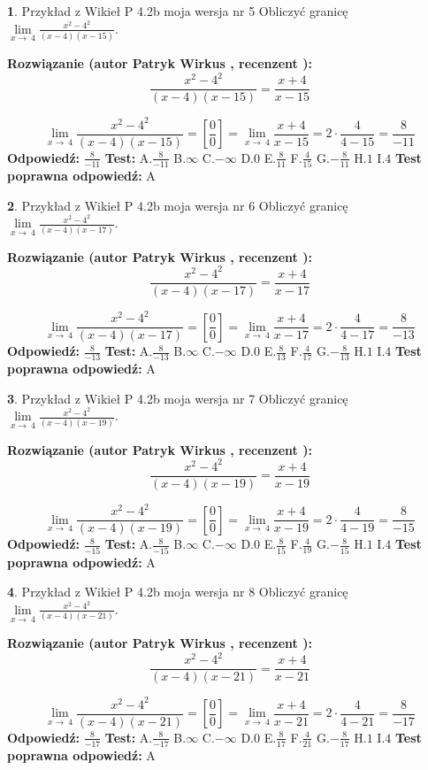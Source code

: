 \documentclass[12pt, a4paper]{article}
\theoremstyle{definition} %
\newtheorem{zad}{}
\newcommand{\zadStart}[1]{\begin{zad}#1\newline}
\newcommand{\zadStop}{\end{zad}}
\newcommand{\rozwStart}[2]{\noindent \textbf{Rozwiązanie (autor #1 , recenzent #2): }\newline}
\newcommand{\rozwStop}{\newline}
\newcommand{\odpStart}{\noindent \textbf{Odpowiedź:}\newline}
\newcommand{\odpStop}{\newline}
\newcommand{\testStart}{\noindent \textbf{Test:}\newline}
\newcommand{\testStop}{\newline}
\newcommand{\kluczStart}{\noindent \textbf{Test poprawna odpowiedź:}\newline}
\newcommand{\kluczStop}{\newline}
\begin{document}
\zadStart{Przykład z Wikieł P 4.2b moja wersja nr 5}
Obliczyć granicę $\lim\limits_{x\to\ 4}\frac{x^{2}-4^{2}}{(x-4)(x-15)}$.
\zadStop
\rozwStart{Patryk Wirkus}{}
$$\frac{x^{2}-4^{2}}{(x-4)(x-15)}=\frac{x+4}{x-15}$$

$$\lim\limits_{x\to\ 4}\frac{x^{2}-4^{2}}{(x-4)(x-15)}=[\frac{0}{0}]=\lim\limits_{x\to\ 4}\frac{x+4}{x-15}=2 \cdot \frac{4}{4-15} = \frac{8}{-11}$$
\rozwStop
\odpStart
$\frac{8}{-11}$
\odpStop
\testStart
A.$\frac{8}{-11}$
B.$\infty$
C.$-\infty$
D.$0$
E.$\frac{8}{11}$
F.$\frac{4}{15}$
G.$-\frac{8}{11}$
H.$1$
I.$4$
\testStop
\kluczStart
A
\kluczStop



\zadStart{Przykład z Wikieł P 4.2b moja wersja nr 6}
Obliczyć granicę $\lim\limits_{x\to\ 4}\frac{x^{2}-4^{2}}{(x-4)(x-17)}$.
\zadStop
\rozwStart{Patryk Wirkus}{}
$$\frac{x^{2}-4^{2}}{(x-4)(x-17)}=\frac{x+4}{x-17}$$

$$\lim\limits_{x\to\ 4}\frac{x^{2}-4^{2}}{(x-4)(x-17)}=[\frac{0}{0}]=\lim\limits_{x\to\ 4}\frac{x+4}{x-17}=2 \cdot \frac{4}{4-17} = \frac{8}{-13}$$
\rozwStop
\odpStart
$\frac{8}{-13}$
\odpStop
\testStart
A.$\frac{8}{-13}$
B.$\infty$
C.$-\infty$
D.$0$
E.$\frac{8}{13}$
F.$\frac{4}{17}$
G.$-\frac{8}{13}$
H.$1$
I.$4$
\testStop
\kluczStart
A
\kluczStop



\zadStart{Przykład z Wikieł P 4.2b moja wersja nr 7}
Obliczyć granicę $\lim\limits_{x\to\ 4}\frac{x^{2}-4^{2}}{(x-4)(x-19)}$.
\zadStop
\rozwStart{Patryk Wirkus}{}
$$\frac{x^{2}-4^{2}}{(x-4)(x-19)}=\frac{x+4}{x-19}$$

$$\lim\limits_{x\to\ 4}\frac{x^{2}-4^{2}}{(x-4)(x-19)}=[\frac{0}{0}]=\lim\limits_{x\to\ 4}\frac{x+4}{x-19}=2 \cdot \frac{4}{4-19} = \frac{8}{-15}$$
\rozwStop
\odpStart
$\frac{8}{-15}$
\odpStop
\testStart
A.$\frac{8}{-15}$
B.$\infty$
C.$-\infty$
D.$0$
E.$\frac{8}{15}$
F.$\frac{4}{19}$
G.$-\frac{8}{15}$
H.$1$
I.$4$
\testStop
\kluczStart
A
\kluczStop



\zadStart{Przykład z Wikieł P 4.2b moja wersja nr 8}
Obliczyć granicę $\lim\limits_{x\to\ 4}\frac{x^{2}-4^{2}}{(x-4)(x-21)}$.
\zadStop
\rozwStart{Patryk Wirkus}{}
$$\frac{x^{2}-4^{2}}{(x-4)(x-21)}=\frac{x+4}{x-21}$$

$$\lim\limits_{x\to\ 4}\frac{x^{2}-4^{2}}{(x-4)(x-21)}=[\frac{0}{0}]=\lim\limits_{x\to\ 4}\frac{x+4}{x-21}=2 \cdot \frac{4}{4-21} = \frac{8}{-17}$$
\rozwStop
\odpStart
$\frac{8}{-17}$
\odpStop
\testStart
A.$\frac{8}{-17}$
B.$\infty$
C.$-\infty$
D.$0$
E.$\frac{8}{17}$
F.$\frac{4}{21}$
G.$-\frac{8}{17}$
H.$1$
I.$4$
\testStop
\kluczStart
A
\kluczStop
\end{document}

